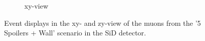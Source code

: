 \begin{figure}
\begin{subfigure}[b]{0.49\textwidth}
        \caption{xy-view}
        \label{fig:zy_5SpoilersWall}
    \end{subfigure}
    \caption[Event displays of muons in SiD from the '5 Spoilers + Wall' scenario]{
    Event displays in the xy- and zy-view of the muons from the '5 Spoilers + Wall' scenario in the SiD detector.
    }
    \label{fig:WIRED4_5SpoilersWall}
\end{figure}